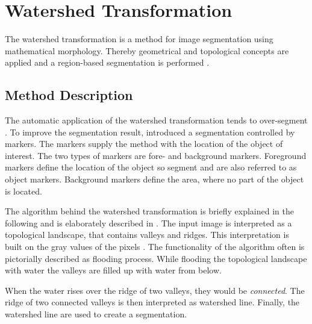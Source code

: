 
\section{Watershed Transformation}\label{ord:ch3:sec2}

The watershed transformation is a method for image segmentation using mathematical morphology. 
Thereby geometrical and topological concepts are applied and a region-based segmentation is performed \cite{VS91-Watershed} \cite{Beu00-Watersheds}.


\subsection{Method Description}\label{ord:ch3:sec2:subsec1}

The automatic application of the watershed transformation tends to over-segment \cite{Beu00-Watersheds}.
To improve the segmentation result, \cite{MS90-MorpologicalSegmentation} introduced a segmentation controlled by markers.
The markers supply the method with the location of the object of interest.
The two types of markers are fore- and background markers.
Foreground markers define the location of the object so segment and are also referred to as object markers.
Background markers define the area, where no part of the object is located.

The algorithm behind the watershed transformation is briefly explained in the following and is elaborately described in \cite{Beu00-Watersheds}.
The input image is interpreted as a topological landscape, that contains valleys and ridges.
This interpretation is built on the gray values of the pixels \cite{PB14-ImageAnalysis}.
The functionality of the algorithm often is pictorially described as flooding process.
While flooding the topological landscape with water the valleys are filled up with water from below.

When the water rises over the ridge of two valleys, they would be \textit{connected}. 
The ridge of two connected valleys is then interpreted as watershed line.
Finally, the watershed line are used to create a segmentation.

